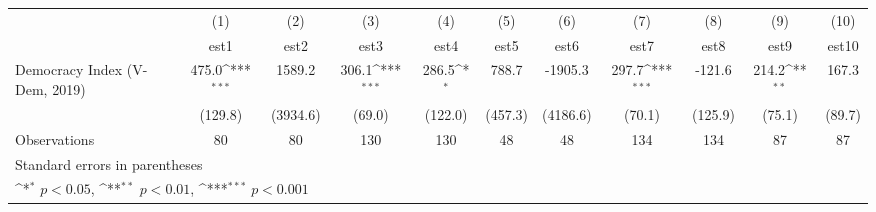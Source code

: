 {
\def\sym#1{\ifmmode^{#1}\else\(^{#1}\)\fi}
\begin{tabular}{l*{10}{c}}
\hline\hline
                    &\multicolumn{1}{c}{(1)}         &\multicolumn{1}{c}{(2)}         &\multicolumn{1}{c}{(3)}         &\multicolumn{1}{c}{(4)}         &\multicolumn{1}{c}{(5)}         &\multicolumn{1}{c}{(6)}         &\multicolumn{1}{c}{(7)}         &\multicolumn{1}{c}{(8)}         &\multicolumn{1}{c}{(9)}         &\multicolumn{1}{c}{(10)}         \\
                    &        est1         &        est2         &        est3         &        est4         &        est5         &        est6         &        est7         &        est8         &        est9         &       est10         \\
\hline
Democracy Index (V-Dem, 2019)&       475.0\sym{***}&      1589.2         &       306.1\sym{***}&       286.5\sym{*}  &       788.7         &     -1905.3         &       297.7\sym{***}&      -121.6         &       214.2\sym{**} &       167.3         \\
                    &     (129.8)         &    (3934.6)         &      (69.0)         &     (122.0)         &     (457.3)         &    (4186.6)         &      (70.1)         &     (125.9)         &      (75.1)         &      (89.7)         \\
\hline
Observations        &          80         &          80         &         130         &         130         &          48         &          48         &         134         &         134         &          87         &          87         \\
\hline\hline
\multicolumn{11}{l}{\footnotesize Standard errors in parentheses}\\
\multicolumn{11}{l}{\footnotesize \sym{*} \(p<0.05\), \sym{**} \(p<0.01\), \sym{***} \(p<0.001\)}\\
\end{tabular}
}
